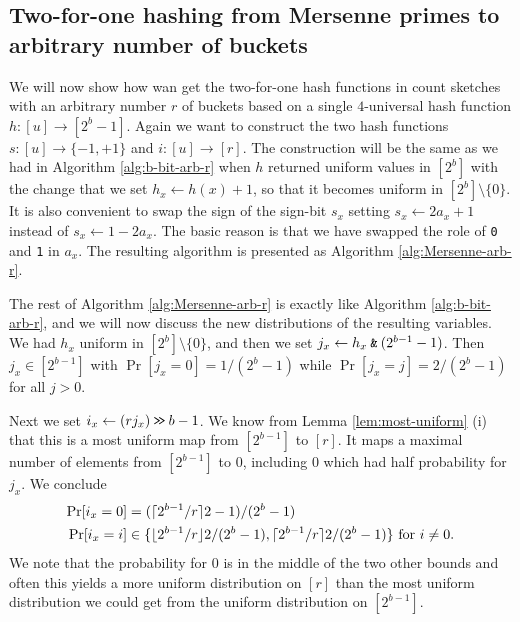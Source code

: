 \subsection{Two-for-one hashing from Mersenne primes to arbitrary number of buckets}
We will now show how wan get the two-for-one hash functions in count
sketches with an arbitrary number $r$ of buckets based on a single
$4$-universal hash function $h:[u]\to [2^b-1]$.  Again we want to
construct the two hash functions $s:[u]\to\{-1,+1\}$ and
$i:[u]\to[r]$.  The construction will be the same as we had in
Algorithm \ref{alg:b-bit-arb-r} when $h$ returned uniform values in
$[2^b]$ with the change that we set $h_x\gets h(x)+1$, so that it
becomes uniform in $[2^b]\setminus\{0\}$. It is also convenient to
swap the sign of the sign-bit $s_x$ setting $s_x\gets 2a_x+1$ instead
of $s_x\gets 1-2a_x$. The basic reason is that we have swapped the
role of \texttt{0} and \texttt{1} in $a_x$.  The resulting algorithm
is presented as Algorithm \ref{alg:Mersenne-arb-r}.
The rest of Algorithm \ref{alg:Mersenne-arb-r} is exactly like 
Algorithm \ref{alg:b-bit-arb-r}, and we will now discuss the new
distributions of the resulting variables. We had
$h_x$ uniform in $[2^b]\setminus\{0\}$, and then we set
$j_x \gets h_x\mathbin{\texttt{\&}}(2^{b-1}-1)$. Then $j_x\in[2^{b-1}]$ with 
$\Pr[j_x=0]=1/(2^{b}-1)$ while  $\Pr[j_x=j]=2/(2^{b}-1)$ for all $j>0$.

Next we set $i_x\gets (rj_x)\mathbin{\texttt{>\!>}} b-1$. We know from Lemma
\ref{lem:most-uniform} (i) that this is a most uniform map from
$[2^{b-1}]$ to $[r]$.  It maps a maximal number of elements from
$[2^{b-1}]$ to $0$, including $0$ which had half probability for
$j_x$.
We conclude
\begin{align}
   \Pr[i_x=0] &= (\lceil {2^{b-1}/r}\rceil2-1)/(2^{b}-1)
   \label{eq:prix0}
   \\
   \Pr[i_x = i] &\in
   \{\lfloor {2^{b-1}/r} \rfloor2/(2^{b}-1), \lceil {2^{b-1}/r}\rceil2/(2^{b}-1)\}
   \mbox{ for $i \neq  0$}
   \label{eq:prixneq0}
   .
\end{align}
We note
that the probability for $0$ is in the middle of the two other
bounds and often this yields a more uniform distribution on $[r]$ than
the most uniform distribution we could get from the
uniform distribution on $[2^{b-1}]$.

